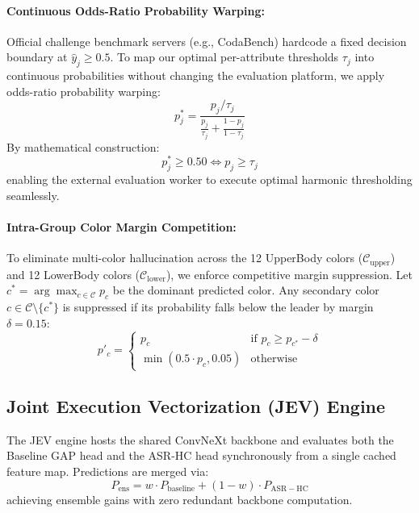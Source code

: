 \paragraph{Continuous Odds-Ratio Probability Warping:}
Official challenge benchmark servers (e.g., CodaBench) hardcode a fixed decision boundary at $\hat{y}_j \ge 0.5$. To map our optimal per-attribute thresholds $\tau_j$ into continuous probabilities without changing the evaluation platform, we apply odds-ratio probability warping:
\begin{equation}
    p^*_j = \frac{p_j / \tau_j}{\frac{p_j}{\tau_j} + \frac{1 - p_j}{1 - \tau_j}}
    \label{eq:odds_warping}
\end{equation}
By mathematical construction:
\begin{equation}
    p^*_j \ge 0.50 \iff p_j \ge \tau_j
\end{equation}
enabling the external evaluation worker to execute optimal harmonic thresholding seamlessly.

\paragraph{Intra-Group Color Margin Competition:}
To eliminate multi-color hallucination across the 12 UpperBody colors ($\mathcal{C}_{\mathrm{upper}}$) and 12 LowerBody colors ($\mathcal{C}_{\mathrm{lower}}$), we enforce competitive margin suppression. Let $c^* = \arg\max_{c \in \mathcal{C}} p_c$ be the dominant predicted color. Any secondary color $c \in \mathcal{C} \setminus \{c^*\}$ is suppressed if its probability falls below the leader by margin $\delta = 0.15$:
\begin{equation}
    p'_c = \begin{cases}
        p_c & \text{if } p_c \ge p_{c^*} - \delta \\
        \min(0.5 \cdot p_c, 0.05) & \text{otherwise}
    \end{cases}
\end{equation}

\subsection{Joint Execution Vectorization (JEV) Engine}
The JEV engine hosts the shared ConvNeXt backbone and evaluates both the Baseline GAP head and the ASR-HC head synchronously from a single cached feature map. Predictions are merged via:
\begin{equation}
    P_{\mathrm{ens}} = w \cdot P_{\mathrm{baseline}} + (1 - w) \cdot P_{\mathrm{ASR-HC}}
\end{equation}
achieving ensemble gains with zero redundant backbone computation.
